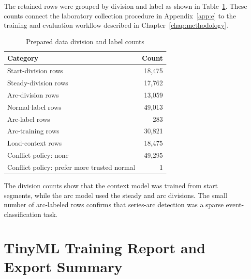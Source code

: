 The retained rows were grouped by division and label as shown in
Table~\ref{tab:app-f-label-division}. These counts connect the laboratory
collection procedure in Appendix~\ref{app:e} to the training and evaluation
workflow described in Chapter~\ref{chap:methodology}.
\begin{table}[H]
  \centering
  \caption{Prepared data division and label counts}
  \label{tab:app-f-label-division}
  \begin{tabular}{lr}
    \toprule
    \textbf{Category} & \textbf{Count} \\
    \midrule
    Start-division rows & 18,475 \\
    Steady-division rows & 17,762 \\
    Arc-division rows & 13,059 \\
    Normal-label rows & 49,013 \\
    Arc-label rows & 283 \\
    Arc-training rows & 30,821 \\
    Load-context rows & 18,475 \\
    Conflict policy: none & 49,295 \\
    Conflict policy: prefer more trusted normal & 1 \\
    \bottomrule
  \end{tabular}
\end{table}

The division counts show that the context model was trained from start
segments, while the arc model used the steady and arc divisions. The small
number of arc-labeled rows confirms that series-arc detection was a sparse
event-classification task.

\section{TinyML Training Report and Export Summary}
\label{app:f-tinyml-training-summary}


